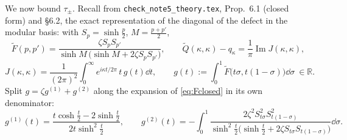 \documentclass[11pt]{article}
\begin{document}
We now bound $\tau_\pm$.  Recall from \texttt{check\_note5\_theory.tex}, Prop.~6.1 (closed form) and
\S6.2, the exact representation of the diagonal of the defect in the modular basis: with
$S_p=\sinh\frac p2$, $M=\frac{p+p'}2$,
\begin{equation}\label{eq:Fclosed}
 \widetilde F(p,p')=\frac{\zeta S_pS_{p'}}{\sinh M\,\bigl(\sinh M+2\zeta S_pS_{p'}\bigr)},\qquad
 \widetilde Q(\kappa,\kappa)-q_\kappa=\frac1\pi\operatorname{Im}J(\kappa,\kappa),
\end{equation}
\begin{equation}\label{eq:Jdiag}
 J(\kappa,\kappa)=\frac1{(2\pi)^2}\int_0^\infty e^{i\kappa t/2\pi}\,t\,g(t)\dd t,
 \qquad
 g(t):=\int_0^1\widetilde F\bigl(t\sigma,t(1-\sigma)\bigr)\dd\sigma\ \in\mathbb R .
\end{equation}
Split $g=\zeta g^{(1)}+g^{(2)}$ along the expansion of \eqref{eq:Fclosed} in its own denominator:
\begin{equation}\label{eq:gsplit}
 g^{(1)}(t)=\frac{t\cosh\frac t2-2\sinh\frac t2}{2t\sinh^2\frac t2},
 \qquad
 g^{(2)}(t)=-\int_0^1\frac{2\zeta^2S_{t\sigma}^2S_{t(1-\sigma)}^2}
 {\sinh^2\frac t2\bigl(\sinh\frac t2+2\zeta S_{t\sigma}S_{t(1-\sigma)}\bigr)}\dd\sigma .
\end{equation}
\end{document}
